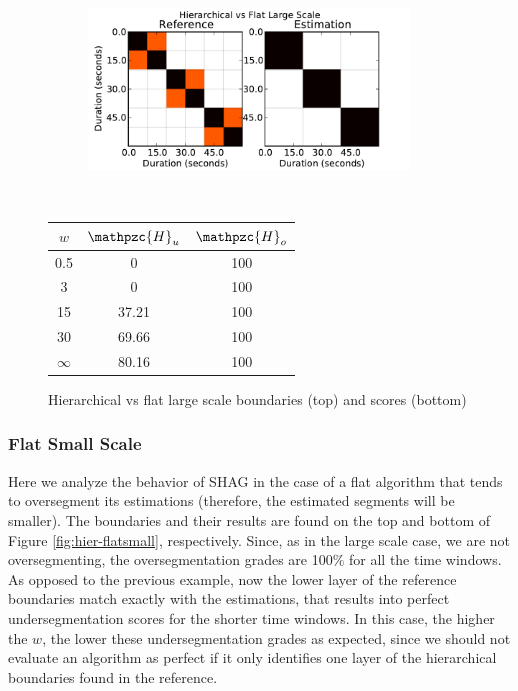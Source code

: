 \documentclass{article}
\begin{document}
\begin{figure}
  \centering
  \begin{subfigure}{0.5\textwidth}
    \centering
    \includegraphics[width=0.94\textwidth]{plots/hier-flatlarge.pdf}
  \end{subfigure}%
  \\
  \begin{minipage}{0.5\textwidth}
    \centering
    \vspace{10pt}
    \begin{tabular}{|c|c|c|}
      \hline
      $w$       & $\mathpzc{H}_u$    & $\mathpzc{H}_o$      \\
      \hline
      0.5       & 0         & 100      \\     
      3         & 0         & 100      \\
      15        & 37.21     & 100    \\
      30        & 69.66     & 100    \\
      $\infty$  & 80.16     & 100    \\
      \hline
    \end{tabular}
  \end{minipage}
  \caption{Hierarchical vs flat large scale boundaries (top) and scores (bottom)}
  \label{fig:hier-flatlarge}
\end{figure}

\subsubsection{Flat Small Scale}

Here we analyze the behavior of SHAG in the case of a flat algorithm that tends to oversegment its estimations (therefore, the estimated segments will be smaller).
The boundaries and their results are found on the top and bottom of Figure \ref{fig:hier-flatsmall}, respectively.
Since, as in the large scale case, we are not oversegmenting, the oversegmentation grades are 100\% for all the time windows.
As opposed to the previous example, now the lower layer of the reference boundaries match exactly with the estimations, that results into perfect undersegmentation scores for the shorter time windows.
In this case, the higher the $w$, the lower these undersegmentation grades as expected, since we should not evaluate an algorithm as perfect if it only identifies one layer of the hierarchical boundaries found in the reference.
\end{document}
